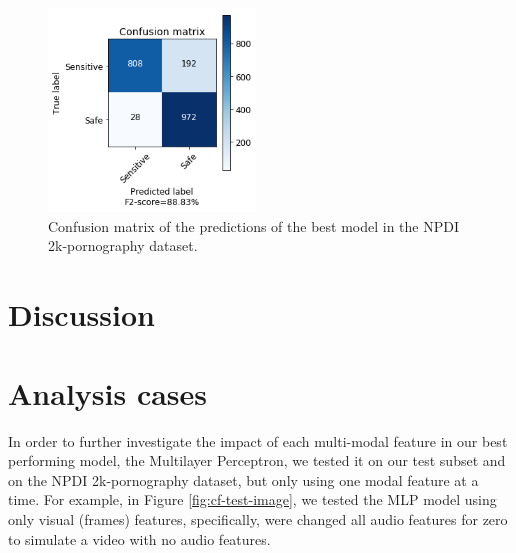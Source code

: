 \begin{figure}[!ht]
    \centering
    \includegraphics[width=0.49\textwidth]{img/results/MLP-2K-TEST.png}
    \caption{Confusion matrix of the predictions of the best model in the NPDI 2k-pornography dataset.}
    \label{fig:cf-test-2k}
\end{figure}


\section{Discussion}\label{sec:discussion}
\section{Analysis cases}\label{sec:experiments-discussion}

In order to further investigate the impact of each multi-modal feature in our best performing model, the Multilayer Perceptron, we tested it on our test subset and on the NPDI 2k-pornography dataset, but only using one modal feature at a time. For example, in Figure \ref{fig:cf-test-image}, we tested the MLP model using only visual (frames) features, specifically, were changed all audio features for zero to simulate a video with no audio features.

